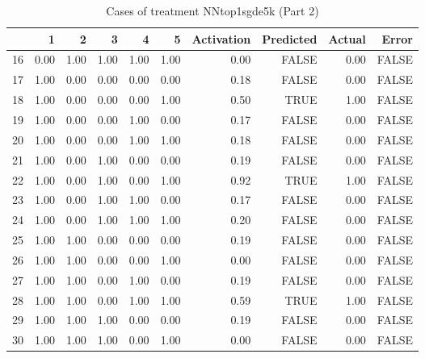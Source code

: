 \begin{table}[ht]
\centering
\begin{tabular}{rrrrrrrrrr}
  \hline
 & 1 & 2 & 3 & 4 & 5 & Activation & Predicted & Actual & Error \\ 
  \hline
16 & 0.00 & 1.00 & 1.00 & 1.00 & 1.00 & 0.00 & FALSE & 0.00 & FALSE \\ 
  17 & 1.00 & 0.00 & 0.00 & 0.00 & 0.00 & 0.18 & FALSE & 0.00 & FALSE \\ 
  18 & 1.00 & 0.00 & 0.00 & 0.00 & 1.00 & 0.50 & TRUE & 1.00 & FALSE \\ 
  19 & 1.00 & 0.00 & 0.00 & 1.00 & 0.00 & 0.17 & FALSE & 0.00 & FALSE \\ 
  20 & 1.00 & 0.00 & 0.00 & 1.00 & 1.00 & 0.18 & FALSE & 0.00 & FALSE \\ 
  21 & 1.00 & 0.00 & 1.00 & 0.00 & 0.00 & 0.19 & FALSE & 0.00 & FALSE \\ 
  22 & 1.00 & 0.00 & 1.00 & 0.00 & 1.00 & 0.92 & TRUE & 1.00 & FALSE \\ 
  23 & 1.00 & 0.00 & 1.00 & 1.00 & 0.00 & 0.17 & FALSE & 0.00 & FALSE \\ 
  24 & 1.00 & 0.00 & 1.00 & 1.00 & 1.00 & 0.20 & FALSE & 0.00 & FALSE \\ 
  25 & 1.00 & 1.00 & 0.00 & 0.00 & 0.00 & 0.19 & FALSE & 0.00 & FALSE \\ 
  26 & 1.00 & 1.00 & 0.00 & 0.00 & 1.00 & 0.00 & FALSE & 0.00 & FALSE \\ 
  27 & 1.00 & 1.00 & 0.00 & 1.00 & 0.00 & 0.19 & FALSE & 0.00 & FALSE \\ 
  28 & 1.00 & 1.00 & 0.00 & 1.00 & 1.00 & 0.59 & TRUE & 1.00 & FALSE \\ 
  29 & 1.00 & 1.00 & 1.00 & 0.00 & 0.00 & 0.19 & FALSE & 0.00 & FALSE \\ 
  30 & 1.00 & 1.00 & 1.00 & 0.00 & 1.00 & 0.00 & FALSE & 0.00 & FALSE \\ 
   \hline
\end{tabular}
\caption{Cases of treatment NNtop1sgde5k (Part 2)} 
\end{table}
